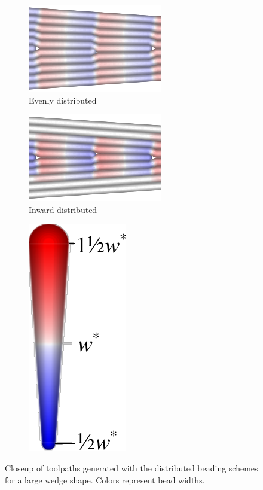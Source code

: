 \begin{figure}
\centering
\setlength{\figwidth}{.4\columnwidth}
\setlength{\figheight}{.25\columnwidth}
\begin{subfigure}{\figwidth}\centering
\includegraphics[height=\figheight,frame]{sources-validation-wedge-Distributed-pretty-evenly.png}
\caption{Evenly distributed}
\end{subfigure}
\begin{subfigure}{\figwidth}\centering
\includegraphics[height=\figheight,frame]{sources-validation-wedge-Distributed-pretty-inward.png}
\caption{Inward distributed}
\end{subfigure}
\begin{subfigure}{.1\columnwidth}\centering
\includegraphics[height=\figheight]{sources-validation-widths-legend-small.pdf}
\end{subfigure}
\caption{
Closeup of toolpaths generated with the distributed beading schemes for a large wedge shape.
Colors represent bead widths.
}
\label{distributed_comparison}
\end{figure}








